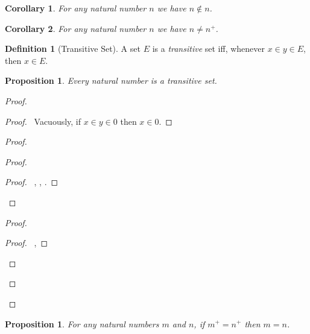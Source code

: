 \documentclass{report}
\let\qed\relax
\newtheorem{prop}[ax]{Proposition}
\newtheorem{cor}{Corollary}[ax]
\theoremstyle{definition}
\newtheorem{df}[ax]{Definition}
\begin{document}
\begin{cor}
\label{cor:n_notin_n}
For any natural number $n$ we have $n \notin n$.
\end{cor}

\begin{cor}
For any natural number $n$ we have $n \neq n^+$.
\end{cor}

\begin{df}[Transitive Set]
A set $E$ is a \emph{transitive} set iff, whenever $x \in y \in E$, then $x \in E$.
\end{df}

\begin{prop}
\label{prop:natural_number_transitive}
Every natural number is a transitive set.
\end{prop}

\begin{proof}
\pf
{}
\begin{proof}
	\pf\ Vacuously, if $x \in y \in 0$ then $x \in 0$.
\end{proof}
\begin{proof}
	\begin{proof}
		\begin{proof}
			\pf\ , , .
		\end{proof}
	\end{proof}
	\begin{proof}
		\begin{proof}
			\pf\ , 
		\end{proof}
	\end{proof}
\end{proof}
\qed
\end{proof}

\begin{prop}
For any natural numbers $m$ and $n$, if $m^+ = n^+$ then $m = n$.
\end{prop}
\end{document}
